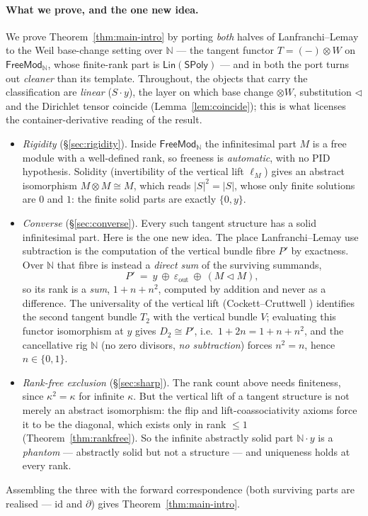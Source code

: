 \documentclass[11pt]{article}
\theoremstyle{definition}
\newcommand{\SPoly}{\mathsf{SPoly}}
\newcommand{\Lin}{\mathsf{Lin}}
\newcommand{\FreeMod}{\mathsf{FreeMod}}
\newcommand{\N}{\mathbb{N}}
\newcommand{\id}{\mathrm{id}}
\begin{document}
\paragraph{What we prove, and the one new idea.}
We prove Theorem~\ref{thm:main-intro} by porting \emph{both} halves of Lanfranchi--Lemay to the
Weil base-change setting over $\N$ --- the tangent functor $T=(-)\otimes W$ on $\FreeMod_\N$, whose
finite-rank part is $\Lin(\SPoly)$ --- and in both the port turns out \emph{cleaner} than its template.
Throughout, the objects that carry the classification are \emph{linear} ($S\cdot y$), the layer on
which base change $\otimes W$, substitution $\lhd$ and the Dirichlet tensor coincide
(Lemma~\ref{lem:coincide}); this is what licenses the container-derivative reading of the result.
\begin{itemize}
\item \emph{Rigidity} (\S\ref{sec:rigidity}). Inside $\FreeMod_\N$ the infinitesimal part $M$ is a
free module with a well-defined rank, so freeness is \emph{automatic}, with no PID hypothesis.
Solidity (invertibility of the vertical lift $\ell_M$) gives an abstract isomorphism $M\otimes
M\cong M$, which reads $|S|^2=|S|$, whose only finite solutions are $0$ and $1$: the finite solid
parts are exactly $\{0,y\}$.
\item \emph{Converse} (\S\ref{sec:converse}). Every such tangent structure has
a solid infinitesimal part. Here is the one new idea. The place Lanfranchi--Lemay use subtraction
is the computation of the vertical bundle fibre $P'$ by exactness. Over $\N$ that fibre is instead a
\emph{direct sum} of the surviving summands,
\[
  P'\ =\ y\ \oplus\ \varepsilon_{\mathrm{out}}\ \oplus\ (M\lhd M),
\]
so its rank is a \emph{sum}, $1+n+n^2$, computed by addition and never as a difference. The
universality of the vertical lift (Cockett--Cruttwell \cite{CockettCruttwell2014}) identifies the
second tangent bundle $T_2$ with the vertical bundle $V$; evaluating this functor isomorphism at
$y$ gives $D_2\cong P'$, i.e.\ $1+2n=1+n+n^2$, and the cancellative rig $\N$ (no zero divisors,
\emph{no subtraction}) forces $n^2=n$, hence $n\in\{0,1\}$.
\item \emph{Rank-free exclusion} (\S\ref{sec:sharp}). The rank count above needs finiteness, since
$\kappa^2=\kappa$ for infinite $\kappa$. But the vertical lift of a tangent structure is not merely
an abstract isomorphism: the flip and lift-coassociativity axioms force it to be the diagonal, which
exists only in rank $\le1$ (Theorem~\ref{thm:rankfree}). So the infinite
abstractly solid part $\N\cdot y$ is a \emph{phantom} --- abstractly solid but not a structure --- and uniqueness holds at
every rank.
\end{itemize}
Assembling the three with the forward correspondence (both surviving parts are realised ---
$\id$ and $\partial$) gives Theorem~\ref{thm:main-intro}.
\end{document}
